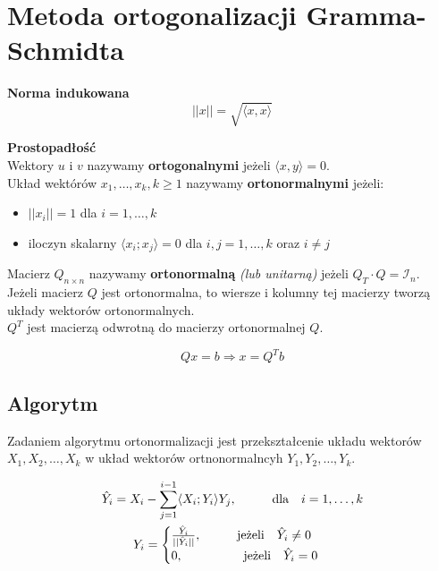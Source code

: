 \documentclass[../mn-notatki.tex]{subfiles}
\begin{document}
\section{Metoda ortogonalizacji Gramma-Schmidta}

\begin{tcolorbox}
\textbf{Norma indukowana}
\[
||x|| = \sqrt{\langle x,x \rangle}
\]
\end{tcolorbox}

\begin{tcolorbox}
\textbf{Prostopadłość}\\
Wektory $u$ i $v$ nazywamy \textbf{ortogonalnymi} jeżeli $\langle x,y \rangle = 0$.\\
Układ wektórów $x_1, \ldots, x_k, k \geqslant 1$ nazywamy \textbf{ortonormalnymi}
jeżeli:
\begin{itemize}
    \item $||x_i|| = 1$ dla $i = 1, \ldots, k$
    \item iloczyn skalarny $\langle x_i; x_j \rangle = 0$ dla $i,j = 1, \ldots, k$ oraz $i \neq j$
\end{itemize}
\end{tcolorbox}

\begin{tcolorbox}
Macierz $Q_{n\times n}$ nazywamy \textbf{ortonormalną} \textit{(lub unitarną)}
jeżeli $Q_T \cdot Q = \mathcal{I}_n$.\\

Jeżeli macierz $Q$ jest ortonormalna, to wiersze i kolumny tej macierzy
tworzą układy wektorów ortonormalnych.\\

$Q^T$ jest macierzą odwrotną do macierzy ortonormalnej $Q$.
\end{tcolorbox}

\begin{tcolorbox}
\[
Qx = b \Rightarrow x = Q^T b
\]
\end{tcolorbox}

\subsection{Algorytm}
\begin{tcolorbox}
Zadaniem algorytmu ortonormalizacji jest przekształcenie układu
wektorów $X_1 ,X_2 ,\ldots,X_k$ w układ wektorów ortnonormalncyh $Y_1 ,Y_2 ,\ldots,Y_k$.
\end{tcolorbox}

\begin{gather*}
\hat{Y}_i = X_i - \sum_{j=1}^{i-1} \langle X_i; Y_i \rangle Y_j, \hspace*{1cm} \text{dla~~ } i = 1, \ldots, k\\
Y_i =
\begin{cases}
\frac{\hat{Y}_i}{||\hat{Y}_i||}, \hspace*{1cm} \text{jeżeli~~ } \hat{Y}_i \neq 0\\
0, \hspace*{1cm} \text{~~~~~~jeżeli~~ } \hat{Y}_i = 0
\end{cases}
\end{gather*}

\pagebreak
\end{document}

